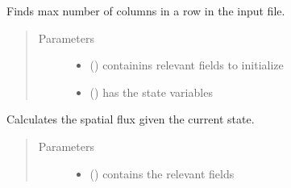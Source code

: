 \documentclass[letterpaper,10pt,english]{sphinxmanual}
\begin{document}
\begin{fulllineitems}
\begin{fulllineitems}
\label{\detokenize{autoapi/NavierStokes/index:NavierStokes.NavierStokes.init_state}}
\sphinxAtStartPar
Finds max number of columns in a row in the input file.
\begin{quote}\begin{description}
\item[{Parameters}] \leavevmode\begin{itemize}
\item {} 
\sphinxAtStartPar
{} ({\hyperref[\detokenize{autoapi/Workspace/index:Workspace.Workspace}]{}}) \textendash{} containins relevant fields to initialize

\item {} 
\sphinxAtStartPar
{} ({\hyperref[\detokenize{autoapi/Field/index:Field.Field}]{}}) \textendash{} has the state variables

\end{itemize}

\end{description}\end{quote}

\end{fulllineitems}


\begin{fulllineitems}
\label{\detokenize{autoapi/NavierStokes/index:NavierStokes.NavierStokes.get_flux}}
\sphinxAtStartPar
Calculates the spatial flux given the current state.
\begin{quote}\begin{description}
\item[{Parameters}] \leavevmode\begin{itemize}
\item {} 
\sphinxAtStartPar
{} ({\hyperref[\detokenize{autoapi/Workspace/index:Workspace.Workspace}]{}}) \textendash{} contains the relevant fields


\end{itemize}
\end{description}
\end{quote}
\end{fulllineitems}
\end{fulllineitems}
\end{document}
